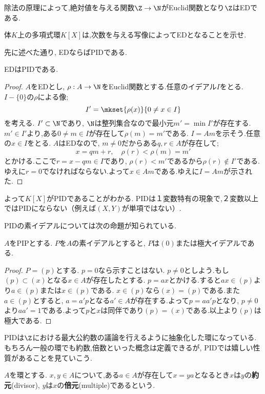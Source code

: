 除法の原理によって,絶対値を与える関数$\Z\to\N$がEuclid関数となり$\Z$はEDである.
\begin{exer}
	体$K$上の多項式環$K[X]$は,次数を与える写像によってEDとなることを示せ.	
\end{exer}

先に述べた通り, EDならばPIDである.
\begin{thm}
	EDはPIDである.
\end{thm}
\begin{proof}
	$A$をEDとし, $\rho:A\to\N$をEuclid関数とする.任意のイデアル$I$をとる. $I-\{0\}$の$\rho$による像;
	\[I'=\mkset{\rho(x)}{0\neq x\in I}\]
	を考える. $I'\subset\N$であり, $\N$は整列集合なので最小元$m'=\min I'$が存在する. $m'\in I'$より,ある$0\neq m\in I$が存在して$\rho(m)=m'$である. $I=Am$を示そう.任意の$x\in I$をとる. $A$はEDなので, $m\neq0$だからある$q,r\in A$が存在して;
	\[x=qm+r,\quad \rho(r)<\rho(m)=m'\]
	とかける.ここで$r=x-qm\in I$であり, $\rho(r)<m'$であるから$\rho(r)\not\in I'$である.ゆえに$r=0$でなければならない.よって$x\in Am$である.ゆえに$I=Am$が示された.
\end{proof}

よって$K[X]$がPIDであることがわかる. PIDは１変数特有の現象で,２変数以上ではPIDにならない（例えば$(X,Y)$が単項ではない）.

PIDの素イデアルについては次の命題が知られている.
\begin{prop}
	$A$をPIPとする. $P$を$A$の素イデアルとすると, $P$は$(0)$または極大イデアルである.
\end{prop}
\begin{proof}
	$P=(p)$とする. $p=0$なら示すことはない. $p\neq0$としよう.もし$(p)\subset (x)$となる$x\in A$が存在したとする. $p=ax$とかける.すると$ax\in (p)$より$a\in (p)$または$x\in (p)$である.  $x\in (p)$なら$(x)=(p)$である.また$a\in (p)$とすると, $a=a'p$となる$a'\in A$が存在する.よって$p=aa'p$となり, $p\neq0$より$aa'=1$である.よって$p$と$x$は同伴であり$(p)=(x)$である.以上より$(p)$は極大である.
\end{proof}

PIDは$\Z$における最大公約数の議論を行えるように抽象化した環になっている.もちろん一般の環でも約数,倍数といった概念は定義できるが, PIDでは嬉しい性質があることを見ていこう. 

\begin{defi}[約元,倍元]
	$A$を環とする. $x,y\in A$について,ある$a\in A$が存在して$x=ya$となるとき$x$は$y$の\textbf{約元}(divisor), $y$は$x$の\textbf{倍元}(multiple)であるという.
\end{defi}

